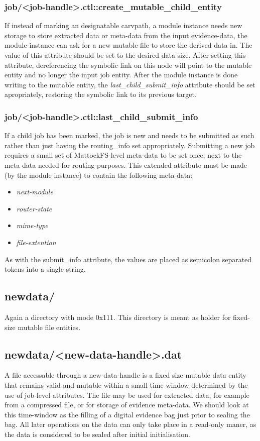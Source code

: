 \subsubsection{job/<job-handle>.ctl::create\_mutable\_child\_entity}
If instead of marking an designatable carvpath, a module instance needs new storage to store extracted data or meta-data from the input evidence-data, the module-instance can ask for a new mutable file to store the derived data in. The value of this attribute should be set to the desired data size. After setting this attribute, dereferencing the symbolic link on this node will point to the mutable entity and no longer the input job entity. After the module instance is done writing to the mutable entity, the \emph{last\_child\_submit\_info} attribute should be set apropriately, restoring the symbolic link to its previous target.
\subsubsection{job/<job-handle>.ctl::last\_child\_submit\_info}
If a child job has been marked, the job is new and needs to be submitted as such rather than just having the routing\_info set appropriately.  Submitting a new job requires a small set of MattockFS-level meta-data to be set once, next to the meta-data needed for routing purposes. This extended attribute must be made (by the module instance) to contain the following meta-data:
\begin{itemize}
\item \emph{next-module}
\item \emph{router-state}
\item \emph{mime-type}
\item \emph{file-extention}
\end{itemize}
As with the submit\_info attribute, the values are placed as semicolon separated tokens into a single string.
\subsection{newdata/}
Again a directory with mode 0x111. This directory is meant as holder for fixed-size mutable file entities.
\subsection{newdata/<new-data-handle>.dat}
A file accessable through a new-data-handle is a fixed size mutable data entity that remains valid and mutable within a small time-window determined by the use of job-level attributes. The file may be used for extracted data, for example from a compressed file, or for storage of evidence meta-data. We should look at this time-window as the filling of a digital evidence bag just prior to sealing the bag. All later operations on the data can only take place in a read-only maner, as the data is considered to be sealed after initial initialisation.
